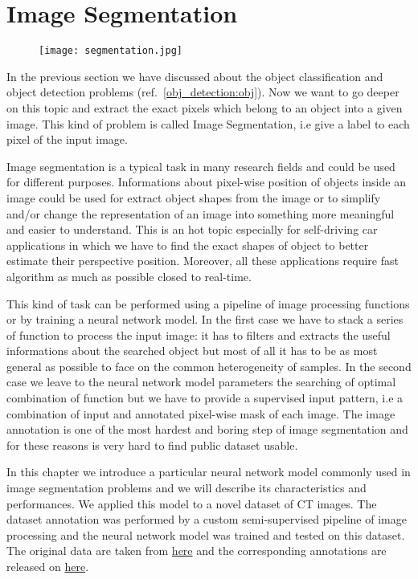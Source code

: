 \documentclass{standalone}
\begin{document}
\section[Segmentation]{Image Segmentation}\label{segmentation:unet}

\begin{center}
\begin{figure}[htbp]
\centering
\texttt{[image: segmentation.jpg]}
\label{fig:segmentation}
\end{figure}
\end{center}

In the previous section we have discussed about the object classification and object detection problems (ref.~\ref{obj_detection:obj}).
Now we want to go deeper on this topic and extract the exact pixels which belong to an object into a given image.
This kind of problem is called Image Segmentation, i.e give a label to each pixel of the input image.

Image segmentation is a typical task in many research fields and could be used for different purposes.
Informations about pixel-wise position of objects inside an image could be used for extract object shapes from the image or to simplify and/or change the representation of an image into something more meaningful and easier to understand.
This is an hot topic especially for self-driving car applications in which we have to find the exact shapes of object to better estimate their perspective position.
Moreover, all these applications require fast algorithm as much as possible closed to real-time.

This kind of task can be performed using a pipeline of image processing functions or by training a neural network model.
In the first case we have to stack a series of function to process the input image: it has to filters and extracts the useful informations about the searched object but most of all it has to be as most general as possible to face on the common heterogeneity of samples.
In the second case we leave to the neural network model parameters the searching of optimal combination of function but we have to provide a supervised input pattern, i.e a combination of input and annotated pixel-wise mask of each image.
The image annotation is one of the most hardest and boring step of image segmentation and for these reasons is very hard to find public dataset usable.

In this chapter we introduce a particular neural network model commonly used in image segmentation problems and we will describe its characteristics and performances.
We applied this model to a novel dataset of CT images.
The dataset annotation was performed by a custom semi-supervised pipeline of image processing and the neural network model was trained and tested on this dataset.
The original data are taken from \href{}{here} and the corresponding annotations are released on \href{}{here}.
\end{document}
